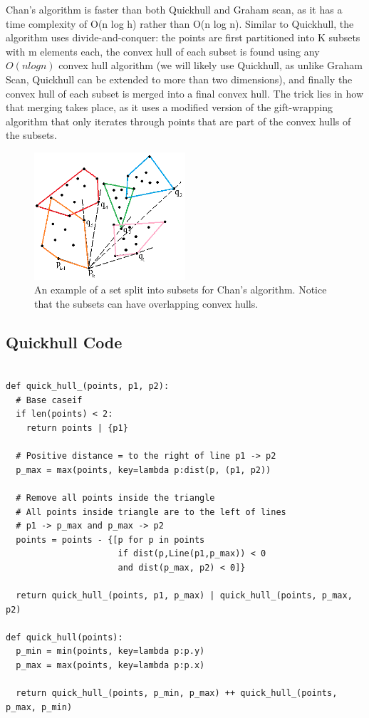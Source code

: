 \documentclass[12pt]{article}
\begin{document}
Chan’s algorithm is faster than both Quickhull and Graham scan, as it has a time complexity of O(n log h) rather than O(n log n). Similar to Quickhull, the algorithm uses divide-and-conquer: the points are first partitioned into K subsets with m elements each, the convex hull of each subset is found using any $O(n log n)$ convex hull algorithm (we will likely use Quickhull, as unlike Graham Scan, Quickhull can be extended to more than two dimensions), and finally the convex hull of each subset is merged into a final convex hull. The trick lies in how that merging takes place, as it uses a modified version of the gift-wrapping algorithm that only iterates through points that are part of the convex hulls of the subsets.

\begin{figure}[h]
	\centering
	\includegraphics[width=0.5\textwidth]{chans.png}
	\caption{An example of a set split into subsets for Chan's algorithm. Notice that the subsets can have overlapping convex hulls.}
\end{figure}

\subsection*{Quickhull Code}

\begin{verbatim}

def quick_hull_(points, p1, p2):
  # Base caseif
  if len(points) < 2:
    return points | {p1}

  # Positive distance = to the right of line p1 -> p2
  p_max = max(points, key=lambda p:dist(p, (p1, p2))

  # Remove all points inside the triangle 
  # All points inside triangle are to the left of lines
  # p1 -> p_max and p_max -> p2
  points = points - {[p for p in points 
                      if dist(p,Line(p1,p_max)) < 0 
                      and dist(p_max, p2) < 0]}

  return quick_hull_(points, p1, p_max) | quick_hull_(points, p_max, p2)

def quick_hull(points):
  p_min = min(points, key=lambda p:p.y) 
  p_max = max(points, key=lambda p:p.x)

  return quick_hull_(points, p_min, p_max) ++ quick_hull_(points, p_max, p_min)
\end{verbatim}
\end{document}
